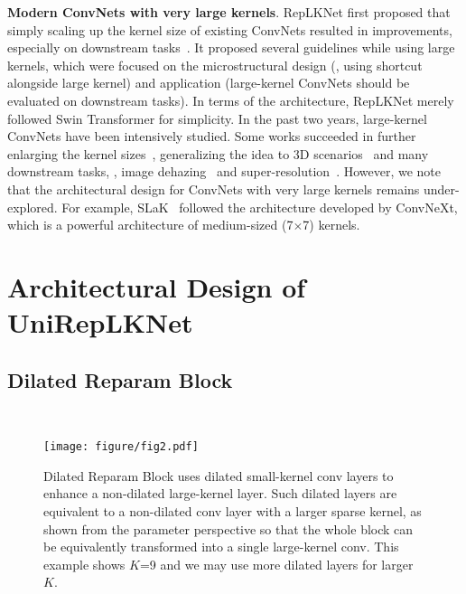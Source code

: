 \documentclass[10pt,twocolumn,letterpaper]{article}
\begin{document}
\noindent\textbf{Modern ConvNets with very large kernels}. RepLKNet first proposed that simply scaling up the kernel size of existing ConvNets resulted in improvements, especially on downstream tasks~\cite{ding2022scaling}. It proposed several guidelines while using large kernels, which were focused on the microstructural design (\eg, using shortcut alongside large kernel) and application (large-kernel ConvNets should be evaluated on downstream tasks). In terms of the architecture, RepLKNet merely followed Swin Transformer for simplicity. In the past two years, large-kernel ConvNets have been intensively studied. Some works succeeded in further enlarging the kernel sizes~\cite{liu2022more}, generalizing the idea to 3D scenarios~\cite{chen2023largekernel3d} and many downstream tasks, \eg, image dehazing~\cite{luo2023lkd} and super-resolution~\cite{xie2023large}. However, we note that the architectural design for ConvNets with very large kernels remains under-explored. For example, SLaK~\cite{liu2022more} followed the architecture developed by ConvNeXt, which is a powerful architecture of medium-sized (7$\times$7) kernels. 

 \section{Architectural Design of UniRepLKNet}

\subsection{Dilated Reparam Block}~\label{sec-dil-reparam}

	\begin{figure*}
		\begin{center}
            \texttt{[image: figure/fig2.pdf]}
            \vspace{-0.1in}
			\caption{Dilated Reparam Block uses dilated small-kernel conv layers to enhance a non-dilated large-kernel layer. Such dilated layers are equivalent to a non-dilated conv layer with a larger sparse kernel, as shown from the parameter perspective so that the whole block can be equivalently transformed into a single large-kernel conv. This example shows $K$=9 and we may use more dilated layers for larger $K$.}
			\label{fig-reparam}
			\vspace{-0.25in}
		\end{center}
	\end{figure*}
\end{document}
